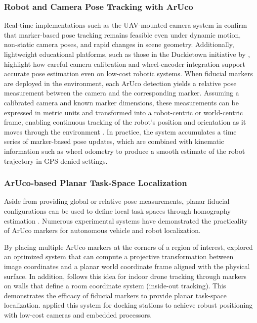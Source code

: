 \subsubsection{Robot and Camera Pose Tracking with ArUco}
Real-time implementations such as the UAV-mounted camera system in \cite{Waqas2022FiducialUAVSHM} confirm that marker-based pose tracking remains feasible even under dynamic motion, non-static camera poses, and rapid changes in scene geometry. Additionally, lightweight educational platforms, such as those in the Duckietown initiative by \cite{Krinkin2019DuckietownCalibration}, highlight how careful camera calibration and wheel-encoder integration support accurate pose estimation even on low-cost robotic systems.
When fiducial markers are deployed in the environment, each ArUco detection yields a relative pose measurement between the camera and the corresponding marker. Assuming a calibrated camera and known marker dimensions, these measurements can be expressed in metric units and transformed into a robot-centric or world-centric frame, enabling continuous tracking of the robot’s position and orientation as it moves through the environment \citep{Montecchio2022FiducialsUAV, Zhou2022UAVIndoorLocalization}. In practice, the system accumulates a time series of marker-based pose updates, which are combined with kinematic information such as wheel odometry to produce a smooth estimate of the robot trajectory in GPS‑denied settings.



\subsubsection{ArUco-based Planar Task-Space Localization}
Aside from providing global or relative pose measurements, planar fiducial configurations can be used to define local task spaces through homography estimation \citep{Braun2022RobotAtFactoryLocalization}. Numerous experimental systems have demonstrated the practicality of ArUco markers for autonomous vehicle and robot localization.

By placing multiple ArUco markers at the corners of a region of interest, \cite{Huang2022OptimizingMarkerPlacement} explored an optimized system that can compute a projective transformation between image coordinates and a planar world coordinate frame aligned with the physical surface. In addition, \cite{Rosner2025MultimodalIndoorDroneDataset} follows this idea for indoor drone tracking through markers on walls that define a room coordinate system (inside-out tracking). This demonstrates the efficacy of fiducial markers to provide planar task-space localization. \cite{Oh2025RegressionDockingAruco} applied this system for docking stations to achieve robust positioning with low-cost cameras and embedded processors. 

